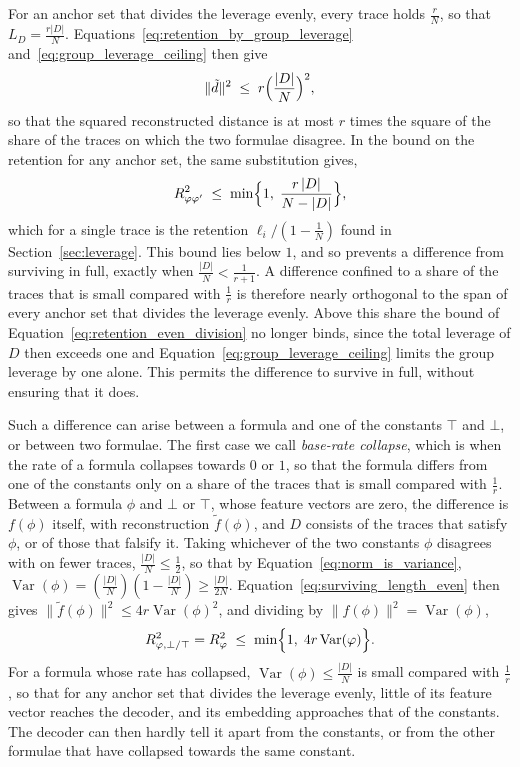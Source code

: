 \documentclass[titlepage,a4paper,11pt]{report}
\begin{document}
    For an anchor set that divides the leverage evenly, every trace holds $\frac rN$, so that $L_D = \frac{r|D|}{N}$. Equations~\eqref{eq:retention_by_group_leverage} and~\eqref{eq:group_leverage_ceiling} then give
    \begin{equation}\label{eq:surviving_length_even}
        \lVert\tilde d\rVert^2\;\le\;r\Bigl(\frac{|D|}{N}\Bigr)^2 ,
    \end{equation}
    so that the squared reconstructed distance is at most $r$ times the square of the share of the traces on which the two formulae disagree. In the bound on the retention for any anchor set, the same substitution gives,
    \begin{equation}\label{eq:retention_even_division}
        R^2_{\phi\phi'}\;\le\;\min\Bigl\{1,\;\frac{r\,|D|}{N-|D|}\Bigr\},
    \end{equation}
    which for a single trace is the retention $\ell_i/(1-\frac1N)$ found in Section~\ref{sec:leverage}. This bound lies below $1$, and so prevents a difference from surviving in full, exactly when $\frac{|D|}{N}<\frac{1}{r+1}$. A difference confined to a share of the traces that is small compared with $\frac1r$ is therefore nearly orthogonal to the span of every anchor set that divides the leverage evenly. Above this share the bound of Equation~\eqref{eq:retention_even_division} no longer binds, since the total leverage of $D$ then exceeds one and Equation~\eqref{eq:group_leverage_ceiling} limits the group leverage by one alone. This permits the difference to survive in full, without ensuring that it does.

    Such a difference can arise between a formula and one of the constants $\top$ and $\bot$, or between two formulae. The first case we call \emph{base-rate collapse}, which is when the rate of a formula collapses towards $0$ or $1$, so that the formula differs from one of the constants only on a share of the traces that is small compared with $\frac1r$. Between a formula $\phi$ and $\bot$ or $\top$, whose feature vectors are zero, the difference is $f(\phi)$ itself, with reconstruction $\tilde f(\phi)$, and $D$ consists of the traces that satisfy $\phi$, or of those that falsify it. Taking whichever of the two constants $\phi$ disagrees with on fewer traces, $\frac{|D|}{N}\le\frac12$, so that by Equation~\eqref{eq:norm_is_variance}, $\operatorname{Var}(\phi)=(\frac{|D|}{N})(1-\frac{|D|}{N})\ge\frac{|D|}{2N}$. Equation~\eqref{eq:surviving_length_even} then gives $\lVert\tilde f(\phi)\rVert^2\le4r\operatorname{Var}(\phi)^2$, and dividing by $\lVert f(\phi)\rVert^2=\operatorname{Var}(\phi)$,
    \begin{equation}\label{eq:retention_variance}
        R^2_{\phi,\bot/\top} = R^2_\phi\;\le\;\min\Bigl\{1,\;4r\operatorname{Var}(\phi)\Bigr\}.
    \end{equation}
    For a formula whose rate has collapsed, $\operatorname{Var}(\phi)\le\frac{|D|}{N}$ is small compared with $\frac1r$, so that for any anchor set that divides the leverage evenly, little of its feature vector reaches the decoder, and its embedding approaches that of the constants. The decoder can then hardly tell it apart from the constants, or from the other formulae that have collapsed towards the same constant.
 
\end{document}
